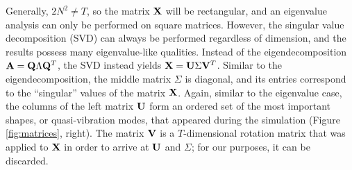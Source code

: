 Generally, $2N^2 \neq T$, so the matrix $\mathbf{X}$ will be rectangular, and an eigenvalue analysis can only be performed on square matrices. However, the singular value decomposition (SVD) can always be performed regardless of dimension, and the results possess many eigenvalue-like qualities. Instead of the eigendecomposition $\mathbf{A} = \mathbf{Q} \Lambda \mathbf{Q}^T$, the SVD instead yields $\mathbf{X} = \mathbf{U} \Sigma \mathbf{V}^T$. Similar to the eigendecomposition, the middle matrix $\Sigma$ is diagonal, and its entries correspond to the ``singular'' values of the matrix $\mathbf{X}$. Again, similar to the eigenvalue case, the columns of the left matrix $\mathbf{U}$ form an ordered set of the most important shapes, or quasi-vibration modes, that appeared during the simulation (Figure \ref{fig:matrices}, right). The matrix $\mathbf{V}$ is a $T$-dimensional rotation matrix that was applied to $\mathbf{X}$ in order to arrive at $\mathbf{U}$ and $\Sigma$; for our purposes, it can be discarded.



